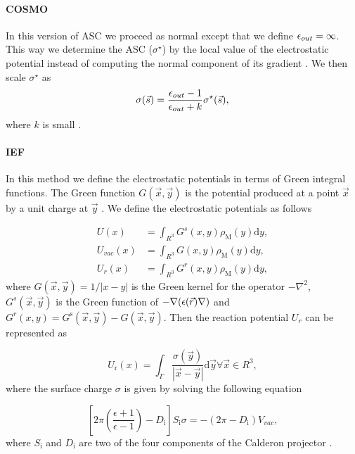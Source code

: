 \documentclass[../Thesis.tex]{subfiles}
\begin{document}
\paragraph{\ac{COSMO}}
In this version of \ac{ASC} we proceed as normal except that we define $\epsilon_{out} = \infty$.
This way we determine the \ac{ASC} ($\sigma^{\star}$) by the local value of the electrostatic
potential instead of computing the normal component of its gradient \cite{Tomasi:2005ipa}.
We then scale $\sigma^{\star}$ as
\begin{equation}
  \sigma(\vec{s}) = \frac{\epsilon_{out} -1}{\epsilon_{out} + k}\sigma^{\star}(\vec{s}),
\end{equation}
where $k$ is small \cite{Tomasi:2005ipa}.

\paragraph{\ac{IEF}}
In this method we define the electrostatic potentials in terms of Green integral
functions. The Green function $G(\vec{x}, \vec{y})$ is the potential produced at
a point $\vec{x}$ by a unit charge at $\vec{y}$ \cite{Tomasi:2005ipa}. We define
the electrostatic potentials as follows

\begin{equation}
\begin{aligned} U(x) &=\int_{R^{3}} G^{s}(x, y) \rho_{\mathrm{M}}(y) \mathrm{d} y, \\
  U_{vac}(x) &=\int_{R^{3}} G(x, y) \rho_{\mathrm{M}}(y) \mathrm{d} y, \\
  U_{r}(x) &=\int_{R^{3}} G^{r}(x, y) \rho_{\mathrm{M}}(y) \mathrm{d} y, \end{aligned}
\end{equation}
where $G(\vec{x}, \vec{y})=1 /|x-y|$ is the Green kernel for the operator
$-\nabla^2$, $G^s(\vec{x}, \vec{y})$  is the Green function of
$-\nabla(\epsilon(\vec{r})\nabla)$ and $G^{r}(x, y)=G^{\mathrm{s}}(\vec{x},
\vec{y})-G(\vec{x}, \vec{y})$. Then the reaction potential $U_r$ can be represented
as  \cite{Tomasi:2005ipa}

\begin{equation}
U_{\mathrm{r}}(x)=\int_{\Gamma} \frac{\sigma(\vec{y})}{|\vec{x}-\vec{y}|}
\mathrm{d} \vec{y} \forall \vec{x} \in R^{3},
\end{equation}
where the surface charge $\sigma$ is given by solving the following equation

\begin{equation}
\left[2 \pi\left(\frac{\epsilon+1}{\epsilon-1}\right)-D_{\mathrm{i}}\right] S_{\mathrm{i}} \sigma=-\left(2 \pi-D_{\mathrm{i}}\right) V_{vac},
\end{equation}
where $S_{\mathrm{i}}$ and  $D_{\mathrm{i}}$ are two of the four components of the Calderon projector \cite{Tomasi:2005ipa}.
\end{document}
